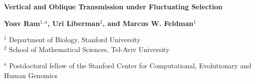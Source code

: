 \documentclass[a0,landscape]{a0poster}
\begin{document}


\begin{minipage}[b]{1\linewidth}

\center \veryHuge \color{NavyBlue} \textbf{Vertical and Oblique Transmission under Fluctuating Selection} \color{Black}\\ %

\vspace{1cm}

\huge \textbf{Yoav Ram$^{1,a}$, Uri Liberman$^{2}$, and Marcus W. Feldman$^1$}\\ %

\vspace{1cm}

\huge $^1$ Department of Biology, Stanford University\\ %
\huge $^{2}$ School of Mathematical Sciences, Tel-Aviv University\\ %

\vspace{1cm}

\Large $^{a}$ Postdoctoral fellow of the Stanford Center for Computational, Evolutionary and Human Genomics

\end{minipage}
%
\end{document}
